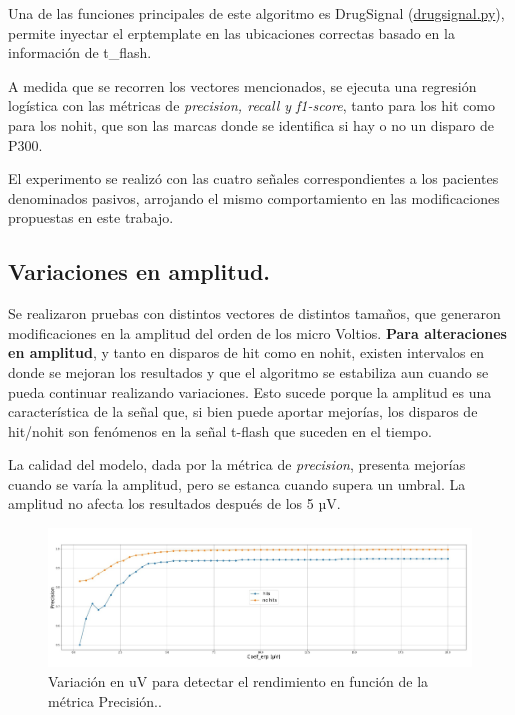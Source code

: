 \documentclass[../00_Main.tex]{subfiles}
\begin{document}
Una de las funciones principales de este algoritmo es DrugSignal (\href{https://github.com/faturita/python-nerv/blob/master/DrugSignal.py}{drugsignal.py}), permite inyectar el erptemplate en las ubicaciones correctas basado en la información de t_flash. 

A medida que se recorren los vectores mencionados, se ejecuta una regresión logística con las métricas de  \textit{precision, recall y f1-score}, tanto para los hit como para los nohit, que son las marcas donde se identifica si hay o no un disparo de P300. 

El experimento se realizó con las cuatro señales correspondientes a los pacientes denominados pasivos, arrojando el mismo comportamiento en las modificaciones propuestas en este trabajo.

\subsection{Variaciones en amplitud.}
Se realizaron pruebas con distintos vectores de distintos tamaños, que generaron modificaciones en la amplitud del orden de los micro Voltios. \textbf{Para alteraciones en amplitud}, y tanto en disparos de hit como en nohit, existen intervalos en donde se mejoran los resultados y que el algoritmo se estabiliza aun cuando se pueda continuar realizando variaciones. Esto sucede porque la amplitud es una característica de la señal que, si bien puede aportar mejorías, los disparos de hit/nohit son fenómenos en la señal t-flash que suceden en el tiempo. 

La calidad del modelo, dada por la métrica de \textit{precision}, presenta mejorías cuando se varía la amplitud, pero se estanca cuando supera un umbral. La amplitud no afecta los resultados después de los 5 µV.

\begin{figure}[H]
    \raggedright
    \includegraphics[scale=0.26]{02_Images/resultados_caso1_a_precision}
    \caption{Variación en uV para detectar el rendimiento en función de la métrica Precisión..}
    \label{fig:resultados_caso1_a_precision}
\end{figure}  
\end{document}
